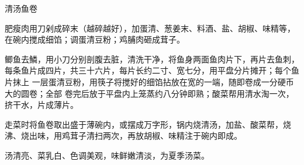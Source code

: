 %
%
%
%
%
%
%
\begin{recipe}{清汤鱼卷}

\ingredients


\preparation

\step 肥瘦肉用刀剁成碎末（越碎越好），加蛋清、葱姜末、料酒、盐、胡椒、味精等，
在碗内搅成细馅；调蛋清豆粉；鸡脯肉砸成茸子。

\step 鲫鱼去鱗，用小刀分别剖腹去脏，清洗干净，将鱼身两面鱼肉片下，再片去鱼刺，
每条鱼片成四片，共三十六片，每片长约二寸、宽七分，用平盘分片摊开；每个鱼片抹上
一层蛋清豆粉，用筷子将搅好的细馅拈放在宽的一端，随即卷成一分硬币大的圆卷；全部
卷完后放于平盘内上笼蒸约八分钟即熟；酸菜帮用清水淘一次，挤干水，片成薄片。

\step 走菜时将鱼卷取出盛于薄碗内，或摆成万字形，锅内烧清汤，加盐、酸菜帮，烧
沸、烧出味，用鸡茸子清扫两次，再放胡椒、味精注于碗内即成。

\features

汤清亮、菜乳白、色调美观，味鲜嫩清淡，为夏季汤菜。

\end{recipe}

